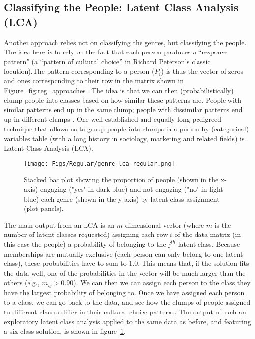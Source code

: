 \subsection{Classifying the People: Latent Class Analysis (LCA)}
Another approach relies not on classifying the genres, but classifying the people. The idea here is to rely on the fact that each person produces a ``response pattern'' (a ``pattern of cultural choice'' in Richard Peterson's \citeyear{peterson83} classic locution).The pattern corresponding to a person ($P_i$) is thus the vector of zeros and ones corresponding to their row in the matrix shown in Figure~\ref{fig:reg_approaches}. The idea is that we can then (probabilistically) clump people into classes based on how similar these patterns are. People with similar patterns end up in the same clump; people with dissimilar patterns end up in different clumps \citep{chan_goldthorpe07, tampubolon2008revisiting}. One well-established and equally long-pedigreed technique that allows us to group people into clumps in a person by (categorical) variables table (with a long history in sociology, marketing and related fields) is Latent Class Analysis (LCA). 

\begin{figure}[ht!]
 \centering
 \texttt{[image: Figs/Regular/genre-lca-regular.png]}
 \caption{\footnotesize Stacked bar plot showing the proportion of people (shown in the x-axis) engaging ("yes" in dark blue) and not engaging ("no" in light blue) each genre (shown in the y-axis) by latent class assignment (plot panels).}
  \label{fig:lca}
 \end{figure}
 
The main output from an LCA is an $m$-dimensional vector (where $m$ is the number of latent classes requested) assigning each row $i$ of the data matrix (in this case the people) a probability of belonging to the $j^{th}$ latent class. Because memberships are mutually exclusive (each person can only belong to one latent class), these probabilities have to sum to $1.0$. This means that, if the solution fits the data well, one of the probabilities in the vector will be much larger than the others (e.g., $m_{ij} > 0.90$). We can then we can assign each person to the class they have the largest probability of belonging to. Once we have assigned each person to a class, we can go back to the data, and see how the clumps of people assigned to different classes differ in their cultural choice patterns. The output of such an exploratory latent class analysis applied to the same data as before, and featuring a six-class solution, is shown in figure~\ref{fig:lca}. 

